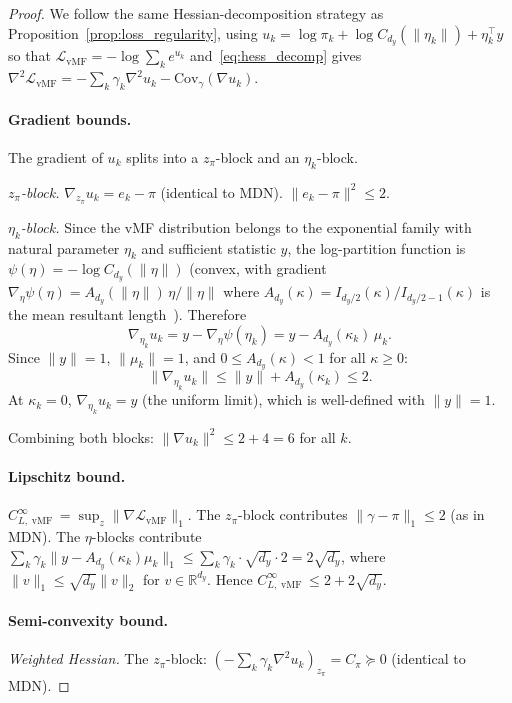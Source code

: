 \documentclass[11pt]{article}
\newcommand{\R}{\mathbb{R}}
\newcommand{\cL}{\mathcal{L}}
\DeclareMathOperator{\vmf}{vMF}
\begin{document}
\begin{proof}
We follow the same Hessian-decomposition strategy as
Proposition~\ref{prop:loss_regularity}, using
$u_k = \log\pi_k + \log C_{d_y}(\|\eta_k\|) + \eta_k^\top y$
so that
$\cL_{\vmf} = -\log\sum_k e^{u_k}$
and~\eqref{eq:hess_decomp} gives
$\nabla^2\cL_{\vmf}
= -\sum_k\gamma_k\nabla^2 u_k - \mathrm{Cov}_\gamma(\nabla u_k)$.

\paragraph{Gradient bounds.}
The gradient of $u_k$ splits into a $z_\pi$-block and an $\eta_k$-block.

\emph{$z_\pi$-block.}
$\nabla_{z_\pi} u_k = e_k - \pi$ (identical to MDN).
$\|e_k - \pi\|^2 \le 2$.

\emph{$\eta_k$-block.}
Since the vMF distribution belongs to the exponential family with
natural parameter $\eta_k$ and sufficient statistic $y$,
the log-partition function is
$\psi(\eta) = -\log C_{d_y}(\|\eta\|)$
(convex, with gradient
$\nabla_\eta\psi(\eta) = A_{d_y}(\|\eta\|)\,\eta/\|\eta\|$
where $A_{d_y}(\kappa)=I_{d_y/2}(\kappa)/I_{d_y/2-1}(\kappa)$
is the mean resultant length~\cite{mardia2000}).
Therefore
\[
  \nabla_{\eta_k} u_k
  = y - \nabla_\eta\psi(\eta_k)
  = y - A_{d_y}(\kappa_k)\,\mu_k.
\]
Since $\|y\|=1$, $\|\mu_k\|=1$, and $0 \le A_{d_y}(\kappa)<1$
for all $\kappa \ge 0$:
\begin{equation}\label{eq:vmf_grad_bound}
  \|\nabla_{\eta_k} u_k\| \le \|y\| + A_{d_y}(\kappa_k) \le 2.
\end{equation}
At $\kappa_k=0$, $\nabla_{\eta_k} u_k = y$ (the uniform limit),
which is well-defined with $\|y\|=1$.

Combining both blocks:
$\|\nabla u_k\|^2 \le 2 + 4 = 6$ for all $k$.

\paragraph{Lipschitz bound.}
$C_{L,\vmf}^\infty = \sup_z \|\nabla\cL_{\vmf}\|_1$.
The $z_\pi$-block contributes
$\|\gamma-\pi\|_1 \le 2$ (as in MDN).
The $\eta$-blocks contribute
$\sum_k \gamma_k\|y-A_{d_y}(\kappa_k)\mu_k\|_1
\le \sum_k \gamma_k \cdot \sqrt{d_y}\cdot 2 = 2\sqrt{d_y}$,
where $\|v\|_1 \le \sqrt{d_y}\|v\|_2$ for $v \in \R^{d_y}$.
Hence $C_{L,\vmf}^\infty \le 2 + 2\sqrt{d_y}$.

\paragraph{Semi-convexity bound.}
\emph{Weighted Hessian.}
The $z_\pi$-block:
$(-\sum_k\gamma_k\nabla^2 u_k)_{z_\pi} = C_\pi \succeq 0$
(identical to MDN).


\end{proof}
\end{document}
